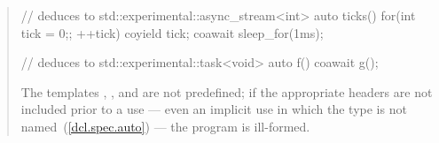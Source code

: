 \begin{quote}
\begin{codeblock}
// deduces to std::experimental::async_stream<int>
auto ticks() {
  for(int tick = 0;; ++tick) {
    coyield tick;
    coawait sleep_for(1ms);
  }
}

// deduces to std::experimental::task<void>
auto f() {  coawait g(); }

\end{codeblock}
\exitexample

\pnum
The templates  , 
, and %
{} are not predefined;
if the appropriate headers are not included prior to a use --- even an implicit use in which the type is not
named~(\ref{dcl.spec.auto}) --- the program is ill-formed.
\end{quote}
